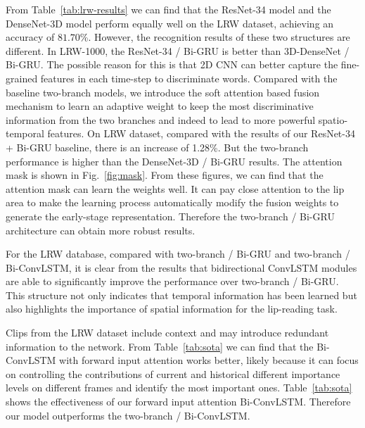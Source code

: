 \documentclass{bmvc2k}
\begin{document}
From Table~\ref{tab:lrw-results} we can find that the ResNet-34 model and the DenseNet-3D model perform equally well on the LRW dataset, achieving an accuracy of $81.70$\%. However, the recognition results of these two structures are different. In LRW-1000, the ResNet-34 / Bi-GRU is better than 3D-DenseNet / Bi-GRU. The possible reason for this is that 2D CNN can better capture the fine-grained features in each time-step to discriminate words. Compared with the baseline two-branch models, we introduce the soft attention based fusion mechanism to learn an adaptive weight to keep the most discriminative information from the two branches and indeed to lead to more powerful spatio-temporal features. On LRW dataset, compared with the results of our ResNet-34 + Bi-GRU baseline, there is an increase of 1.28\%. But the two-branch performance is higher than the DenseNet-3D / Bi-GRU results. The attention mask is shown in Fig.~\ref{fig:mask}. From these figures, we can find that the attention mask can learn the weights well. It can pay close attention to the lip area to make the learning process automatically modify the fusion weights to generate the early-stage representation. Therefore the two-branch / Bi-GRU architecture can obtain more robust results. 


For the LRW database, compared with two-branch / Bi-GRU and two-branch / Bi-ConvLSTM, it is clear from the results that bidirectional ConvLSTM modules are able to significantly improve the performance over two-branch / Bi-GRU. This structure not only indicates that temporal information has been learned but also highlights the importance of spatial information for the lip-reading task.  

Clips from the LRW dataset include context and may introduce redundant information to the network. From Table~\ref{tab:sota} we can find that the Bi-ConvLSTM with forward input attention works better, likely because it can focus on controlling the contributions of current and historical different importance levels on different frames and identify the most important ones. Table~\ref{tab:sota} shows the effectiveness of our forward input attention Bi-ConvLSTM. Therefore our model outperforms the two-branch / Bi-ConvLSTM.
\end{document}
